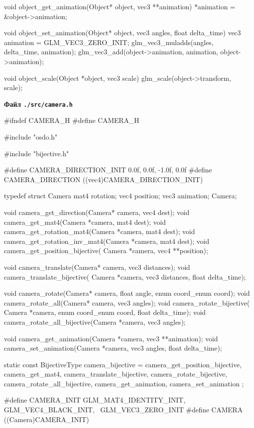 \begin{multicols}{2}
\begin{ccode}
void object_get_animation(Object* object, vec3 **animation) {
    *animation = &object->animation;
}

void object_set_animation(Object* object, vec3 angles, float delta_time) {
    vec3 animation = GLM_VEC3_ZERO_INIT;
    glm_vec3_muladds(angles, delta_time, animation);
    glm_vec3_add(object->animation, animation,
                 object->animation);
}

void object_scale(Object *object, vec3 scale) {
    glm_scale(object->transform, scale);
}
\end{ccode}
\noindent\cprotect\textbf{Файл \verb+./src/camera.h+}
\begin{ccode}
#ifndef CAMERA_H
#define CAMERA_H

#include "osdo.h"

#include "bijective.h"

#define CAMERA_DIRECTION_INIT {0.0f, 0.0f, -1.0f, 0.0f}
#define CAMERA_DIRECTION ((vec4)CAMERA_DIRECTION_INIT)

typedef struct Camera {
    mat4 rotation;
    vec4 position;
    vec3 animation;
} Camera;

void camera_get_direction(Camera* camera, vec4 dest);
void camera_get_mat4(Camera *camera, mat4 dest);
void camera_get_rotation_mat4(Camera *camera, mat4 dest);
void camera_get_rotation_inv_mat4(Camera *camera, mat4 dest);
void camera_get_position_bijective(
        Camera *camera, vec4 **position);

void camera_translate(Camera* camera, vec3 distances);
void camera_translate_bijective(
        Camera *camera, vec3 distances, float delta_time);

void camera_rotate(Camera* camera, float angle, enum coord_enum coord);
void camera_rotate_all(Camera* camera, vec3 angles);
void camera_rotate_bijective(
        Camera *camera, enum coord_enum coord, float delta_time);
void camera_rotate_all_bijective(Camera *camera, vec3 angles);

void camera_get_animation(Camera *camera, vec3 **animation);
void camera_set_animation(Camera *camera, vec3 angles, float delta_time);

static const BijectiveType camera_bijective = {
    camera_get_position_bijective,
    camera_get_mat4,
    camera_translate_bijective,
    camera_rotate_bijective,
    camera_rotate_all_bijective,
    camera_get_animation,
    camera_set_animation
};

#define CAMERA_INIT {GLM_MAT4_IDENTITY_INIT, GLM_VEC4_BLACK_INIT, \
    GLM_VEC3_ZERO_INIT}
#define CAMERA ((Camera)CAMERA_INIT)


\end{ccode}
\end{multicols}
